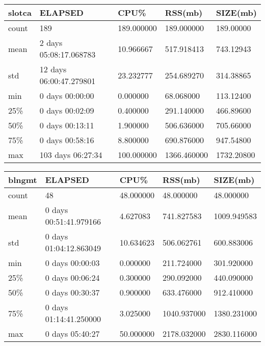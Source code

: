 \documentclass{article}
\begin{document}
\begin{table}[H]
\begin{tabular}{|l|l|l|l|l|}
\hline slotca&    ELAPSED&   CPU\%&  RSS(mb)&   SIZE(mb) \\
\hline count&   189& 189.000000&  189.000000&  189.00000 \\
\hline mean&  2 days 05:08:17.068783&  10.966667&  517.918413&  743.12943 \\
\hline std&  12 days 06:00:47.279801&  23.232777&  254.689270&  314.38865 \\
\hline min&   0 days 00:00:00&  0.000000&  68.068000&  113.12400 \\
\hline 25\%&   0 days 00:02:09&  0.400000&  291.140000&  466.89600 \\
\hline 50\%&   0 days 00:13:11&  1.900000&  506.636000&  705.66000 \\
\hline 75\%&   0 days 00:58:16&  8.800000&  690.876000&  947.54800 \\
\hline max&  103 days 06:27:34& 100.000000& 1366.460000& 1732.20800 \\
\hline 
\end{tabular}
\label{TABLE-SessionSizeslotca}
\end{table}

\begin{table}[H]
\begin{tabular}{|l|l|l|l|l|}
\hline blngmt&                  ELAPSED&       CPU\%&      RSS(mb)&     SIZE(mb) \\
\hline count&                      48&  48.000000&    48.000000&    48.000000 \\
\hline mean&   0 days 00:51:41.979166&   4.627083&   741.827583&  1009.949583 \\
\hline std&    0 days 01:04:12.863049&  10.634623&   506.062761&   600.883006 \\
\hline min&           0 days 00:00:03&   0.000000&   211.724000&   301.920000 \\
\hline 25\%&           0 days 00:06:24&   0.300000&   290.092000&   440.090000 \\
\hline 50\%&           0 days 00:30:37&   0.900000&   633.476000&   912.410000 \\
\hline 75\%&    0 days 01:14:41.250000&   3.025000&  1040.937000&  1380.231000 \\
\hline max&           0 days 05:40:27&  50.000000&  2178.032000&  2830.116000 \\
\hline
\end{tabular}
\label{TABLE-SessionSizeblngmt}
\end{table}
\end{document}
